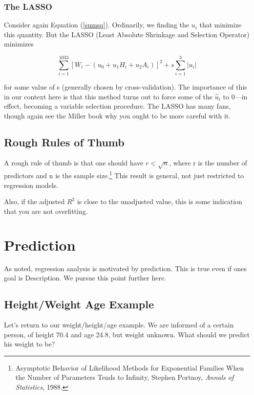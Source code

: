 \subsubsection{The LASSO}

Consider again Equation (\ref{sumsq}).  Ordinarily, we finding the $u_i$
that minimize this quantity.  But the LASSO (Least Absolute Shrinkage
and Selection Operator) minimizes

\begin{equation}
\label{sumsqlass}
\sum_{i=1}^{1033} [W_i - (u_0 + u_1 H_i + 
u_2 A_i)]^2 + s \sum_{i=1}^{3} |u_i|
\end{equation}

for some value of s (generally chosen by cross-validation).  The
importance of this in our context here is that this method turns out to
force some of the $\hat{u}_i$ to 0---in effect, becoming a variable
selection procedure.  The LASSO has many fans, though again see the
Miller book why you ought to be more careful with it.

\subsection{Rough Rules of Thumb}
\label{thumb}

A rough rule of thumb is that one should have $r < \sqrt{n}$, where r is
the number of predictors and n is the sample size.\footnote{Asymptotic
Behavior of Likelihood Methods for Exponential Families When the Number
of Parameters Tends to Infinity, Stephen Portnoy, {\it Annals of
Statistics}, 1988.} This result is general, not just restricted to
regression models.

Also, if the adjusted $R^2$ is close to the unadjusted value, this is
some indication that you are not overfitting.

\section{Prediction}
\label{howpredict}

As noted, regression analysis is motivated by prediction.  This is true
even if ones goal is Description.  We pursue this point further here.

\subsection{Height/Weight Age Example}

Let's return to our weight/height/age example.  We are informed of a
certain person, of height 70.4 and age 24.8, but weight unknown.  What
should we predict his weight to be?

